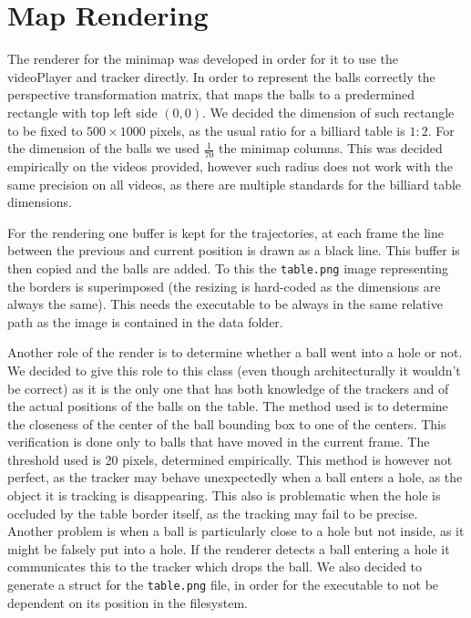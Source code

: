 \section{Map Rendering}

The renderer for the minimap was developed in order for it to use the videoPlayer and 
tracker directly. In order to represent the balls correctly the perspective transformation
matrix, that maps the balls to a predermined rectangle with top left side $(0,0)$. We decided
the dimension of such rectangle to be fixed to $500 \times 1000$ pixels, as the usual ratio
for a billiard table is $1:2$. For the dimension of the balls we used $\frac{1}{70}$ the minimap
columns. This was decided empirically on the videos provided, however such radius does not work
with the same precision on all videos, as there are multiple standards for the billiard table 
dimensions.\par 
For the rendering one buffer is kept for the trajectories, at each frame the line between the
previous and current position is drawn as a black line. This buffer is then copied and the
balls are added. To this the \verb|table.png| image representing the borders is superimposed (the resizing is hard-coded
as the dimensions are always the same). This needs the executable to be always in the same relative
path as the image is contained in the data folder.\par 
Another role of the render is to determine whether a ball went into a hole or not. We decided to
give this role to this class (even though architecturally it wouldn't be correct) as it is the 
only one that has both knowledge of the trackers and of the actual positions of the balls on the table.
The method used is to determine the closeness of the center of the ball bounding box to one 
of the centers. This verification is done only to balls that have moved in the current frame. The
threshold used is 20 pixels, determined empirically. This method is however not perfect, as the 
tracker may behave unexpectedly when a ball enters a hole, as the object it is tracking is disappearing.
This also is problematic when the hole is occluded by the table border itself, as the tracking may fail
to be precise. Another problem is when a ball is particularly close to a hole but not inside, as it
might be falsely put into a hole. If the renderer detects a ball entering a hole it communicates
this to the tracker which drops the ball.
We also decided to generate a struct for the \verb|table.png| file, in order for the executable to not be dependent on its position in the filesystem.
